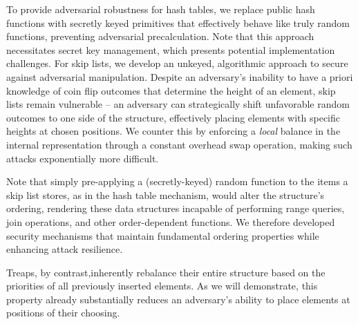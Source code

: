 To provide adversarial robustness for hash tables, we replace public hash functions with secretly keyed primitives that effectively behave like truly random functions, preventing adversarial precalculation. Note that this approach necessitates secret key management, which presents potential implementation challenges. For skip lists, we develop an unkeyed, algorithmic approach to secure against adversarial manipulation. Despite an adversary's inability to have a priori knowledge of coin flip outcomes that determine the height of an element, skip lists remain vulnerable -- an adversary can strategically shift unfavorable random outcomes to one side of the structure, effectively placing elements with specific heights at chosen positions. We counter this by enforcing a \emph{local} balance in the internal representation through a constant overhead swap operation, making such attacks exponentially more difficult.

Note that simply pre-applying a (secretly-keyed) random function to the items a skip list stores, as in the hash table mechanism, would alter the structure's ordering, rendering these data structures incapable of performing range queries, join operations, and other order-dependent functions. We therefore developed security mechanisms that maintain fundamental ordering properties while enhancing attack resilience.

Treaps, by contrast,inherently rebalance their entire structure based on the priorities of all previously inserted elements. As we will demonstrate, this property already substantially reduces an adversary's ability to place elements at positions of their choosing.